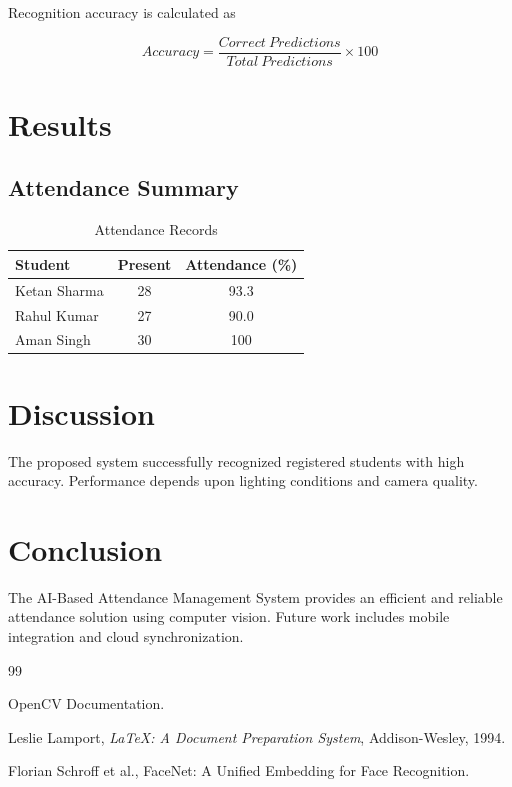 \documentclass[12pt,a4paper]{report}
\begin{document}
	Recognition accuracy is calculated as
	
	\[
	Accuracy = \frac{Correct\ Predictions}{Total\ Predictions}\times100
	\]
	
	
	\chapter{Results}
	
	\section{Attendance Summary}
	
	\begin{table}[H]
		\centering
		\caption{Attendance Records}
		\begin{tabular}{lcc}
			\toprule
			Student & Present & Attendance (\%)\\
			\midrule
			Ketan Sharma & 28 & 93.3\\
			Rahul Kumar & 27 & 90.0\\
			Aman Singh & 30 & 100\\
			\bottomrule
		\end{tabular}
		\label{tab:attendance}
	\end{table}
	
	
	\chapter{Discussion}
	
	The proposed system successfully recognized registered students with high accuracy. Performance depends upon lighting conditions and camera quality.
	
	
	\chapter{Conclusion}
	
	The AI-Based Attendance Management System provides an efficient and reliable attendance solution using computer vision. Future work includes mobile integration and cloud synchronization.
	
	
	\begin{thebibliography}{99}
		
		OpenCV Documentation.
		
		Leslie Lamport,
		\textit{LaTeX: A Document Preparation System},
		Addison-Wesley, 1994.
		
		Florian Schroff et al.,
		FaceNet: A Unified Embedding for Face Recognition.
		
	\end{thebibliography}
	
\end{document}
